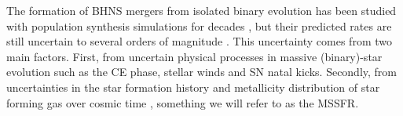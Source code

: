 \documentclass[twocolumn]{aastex63}
\newcommand{\todo}[1]{\textcolor{red}{[To do: #1]}}
\newcommand\bhnsSingle{BHNS\xspace}
\begin{document}





%
The formation of \bhnsSingle mergers from isolated binary evolution has been studied with population synthesis simulations for decades \citep[e.g.][]{1993MNRAS.260..675T, 1999ApJ...526..152F, 2018MNRAS.480.2011G}, but their predicted rates are still uncertain to several orders of magnitude \citep{2010CQGra..27q3001A}. This uncertainty comes from two main factors. 
First, from uncertain physical processes in massive (binary)-star evolution such as the \ac{CE} phase, stellar winds and \ac{SN}  natal kicks. 
%
%
Secondly,  from uncertainties in the star formation history and metallicity distribution of star forming gas over cosmic time \citep[e.g.][]{2019MNRAS.488.5300C, 2019MNRAS.490.3740N,2020MNRAS.493L...6T}, something we will refer to as the  \ac{MSSFR}.
\end{document}
